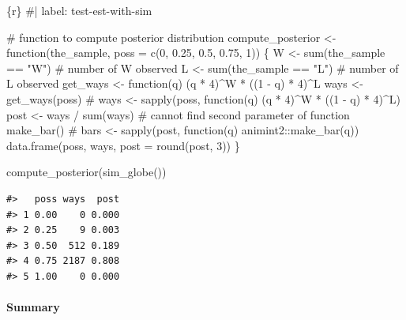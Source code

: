 \documentclass[
  letterpaper,
  DIV=11,
  numbers=noendperiod]{scrreprt}
\let\oldparagraph\paragraph
\renewcommand{\paragraph}[1]{\oldparagraph{#1}\mbox{}}
\newenvironment{Shaded}{\begin{snugshade}}{\end{snugshade}}
\newcommand{\AttributeTok}[1]{\textcolor[rgb]{0.40,0.45,0.13}{#1}}
\newcommand{\CommentTok}[1]{\textcolor[rgb]{0.37,0.37,0.37}{#1}}
\newcommand{\ControlFlowTok}[1]{\textcolor[rgb]{0.00,0.23,0.31}{#1}}
\newcommand{\DecValTok}[1]{\textcolor[rgb]{0.68,0.00,0.00}{#1}}
\newcommand{\FloatTok}[1]{\textcolor[rgb]{0.68,0.00,0.00}{#1}}
\newcommand{\FunctionTok}[1]{\textcolor[rgb]{0.28,0.35,0.67}{#1}}
\newcommand{\InformationTok}[1]{\textcolor[rgb]{0.37,0.37,0.37}{#1}}
\newcommand{\NormalTok}[1]{\textcolor[rgb]{0.00,0.23,0.31}{#1}}
\newcommand{\OtherTok}[1]{\textcolor[rgb]{0.00,0.23,0.31}{#1}}
\newcommand{\SpecialCharTok}[1]{\textcolor[rgb]{0.37,0.37,0.37}{#1}}
\newcommand{\StringTok}[1]{\textcolor[rgb]{0.13,0.47,0.30}{#1}}
\begin{document}
\begin{Shaded}
\begin{Highlighting}[]
\InformationTok{\textasciigrave{}\textasciigrave{}\textasciigrave{}\{r\}}
\CommentTok{\#| label: test{-}est{-}with{-}sim}

\CommentTok{\# function to compute posterior distribution }
\NormalTok{compute\_posterior }\OtherTok{\textless{}{-}} \ControlFlowTok{function}\NormalTok{(the\_sample, }\AttributeTok{poss =} \FunctionTok{c}\NormalTok{(}\DecValTok{0}\NormalTok{, }\FloatTok{0.25}\NormalTok{, }\FloatTok{0.5}\NormalTok{, }\FloatTok{0.75}\NormalTok{, }\DecValTok{1}\NormalTok{)) \{}
\NormalTok{  W }\OtherTok{\textless{}{-}} \FunctionTok{sum}\NormalTok{(the\_sample }\SpecialCharTok{==} \StringTok{"W"}\NormalTok{) }\CommentTok{\# number of W observed}
\NormalTok{  L }\OtherTok{\textless{}{-}} \FunctionTok{sum}\NormalTok{(the\_sample }\SpecialCharTok{==} \StringTok{"L"}\NormalTok{) }\CommentTok{\# number of L observed}
\NormalTok{  get\_ways }\OtherTok{\textless{}{-}} \ControlFlowTok{function}\NormalTok{(q) (q }\SpecialCharTok{*} \DecValTok{4}\NormalTok{)}\SpecialCharTok{\^{}}\NormalTok{W }\SpecialCharTok{*}\NormalTok{ ((}\DecValTok{1} \SpecialCharTok{{-}}\NormalTok{ q) }\SpecialCharTok{*} \DecValTok{4}\NormalTok{)}\SpecialCharTok{\^{}}\NormalTok{L}
\NormalTok{  ways }\OtherTok{\textless{}{-}} \FunctionTok{get\_ways}\NormalTok{(poss)}
  \CommentTok{\# ways \textless{}{-} sapply(poss, function(q) (q * 4)\^{}W * ((1 {-} q) * 4)\^{}L)}
\NormalTok{  post }\OtherTok{\textless{}{-}}\NormalTok{ ways }\SpecialCharTok{/} \FunctionTok{sum}\NormalTok{(ways)}
  \CommentTok{\# cannot find second parameter of function make\_bar()}
  \CommentTok{\# bars \textless{}{-} sapply(post, function(q) animint2::make\_bar(q)) }
  \FunctionTok{data.frame}\NormalTok{(poss, ways, }\AttributeTok{post =} \FunctionTok{round}\NormalTok{(post, }\DecValTok{3}\NormalTok{))}
\NormalTok{\}}

\FunctionTok{compute\_posterior}\NormalTok{(}\FunctionTok{sim\_globe}\NormalTok{())}
\InformationTok{\textasciigrave{}\textasciigrave{}\textasciigrave{}}
\end{Highlighting}
\end{Shaded}

\begin{verbatim}
#>   poss ways  post
#> 1 0.00    0 0.000
#> 2 0.25    9 0.003
#> 3 0.50  512 0.189
#> 4 0.75 2187 0.808
#> 5 1.00    0 0.000
\end{verbatim}

\hypertarget{summary}{%
\paragraph{Summary}\label{summary}}
\end{document}
